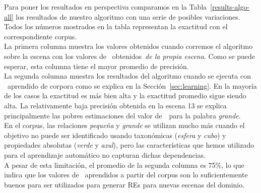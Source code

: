 Para poner los resultados en perspectiva comparamos en la Tabla~\ref{results-algo-all} los resultados de
nuestro algoritmo con una serie de posibles variaciones. Todos los n\'umeros mostrados en la tabla
representan la exactitud con el correspondiente corpus.\\

La primera columna muestra los valores obtenidos cuando corremos el algoritmo sobre la escena
con los valores de \puse\ obtenidos~\emph{de la propia escena}. Como se puede esperar,
esta columna tiene el mayor promedio de precisi\'on.\\


La segunda columna muestra los resultados del algoritmo cuando se ejecuta con \puse\ aprendido de
corpora como se explica en la Secci\'on~\ref{sec:learning}. En la mayor\'{i}a de los casos la exactitud
es m\'as bien alta y la exactitud promedio sigue siendo alta. La relativamente baja precisi\'on
obtenida en la escena 13 se explica principalmente las pobres estimaciones del valor de~\puse\ para la palabra \emph{grande}. \\

En el corpus, las relaciones \emph{peque\~na} y \emph{grande} se utilizan mucho m\'as cuando el objetivo no puede ser identificado usando taxon\'omicas (\emph{esfera} y \emph{cubo}) y propiedades absolutas (\emph{verde} y \emph{azul}), pero las caracter\'{i}sticas que hemos utilizado para el aprendizaje autom\'atico no capturan dichas dependencias.\\


%
%

A pesar de esta limitaci\'on, el promedio de la segunda columna es 75\%, lo que indica que los valores de \puse\ aprendidos a partir del corpus son lo suficientemente buenos para ser utilizados para generar REs para nuevas escenas del dominio.\\

